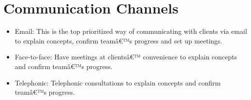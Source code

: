 \documentclass[a4paper]{article}
\begin{document}
	\section{Communication Channels}
	\begin{itemize}
	\item	Email: This is the top prioritized way of communicating with clients via email to explain concepts, confirm teamâ€™s progress and set up meetings.
\item	Face-to-face: Have meetings at clientsâ€™ convenience to explain concepts and confirm teamâ€™s progress.
\item	Telephonic: Telephonic consultations to explain concepts and confirm teamâ€™s progress.

	\end{itemize}
	
\end{document}
